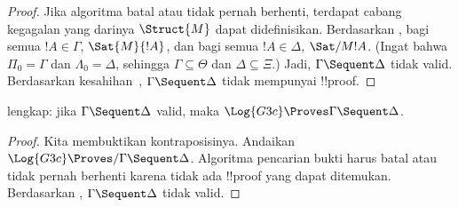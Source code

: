 \documentclass[../../../include/open-logic-section]{subfiles}
\begin{document}
\begin{proof}
  Jika algoritma batal atau tidak pernah berhenti, terdapat cabang kegagalan
  yang darinya $\Struct{M}$ dapat didefinisikan. Berdasarkan
  , bagi semua $!A \in \Gamma$, $\Sat{M}{!A}$, dan bagi
  semua $!A \in \Delta$, $\Sat/{M}{!A}$. (Ingat bahwa
  $\Pi_0 = \Gamma$ dan $\Lambda_0 = \Delta$, sehingga
  $\Gamma \subseteq \Theta$ dan $\Delta \subseteq \Xi$.) Jadi,
  $\Gamma \Sequent \Delta$ tidak valid. Berdasarkan kesahihan~,
  $\Gamma \Sequent \Delta$ tidak mempunyai !!{proof}.
\end{proof}

\begin{cor}
 lengkap: jika $\Gamma \Sequent \Delta$ valid, maka
$\Log{G3c} \Proves \Gamma \Sequent \Delta$.
\end{cor}

\begin{proof}
  Kita membuktikan kontraposisinya. Andaikan $\Log{G3c} \Proves/
  \Gamma \Sequent \Delta$. Algoritma pencarian bukti harus batal atau tidak
  pernah berhenti karena tidak ada !!{proof} yang dapat ditemukan.
  Berdasarkan , $\Gamma \Sequent \Delta$ tidak valid.
\end{proof}
\end{document}
